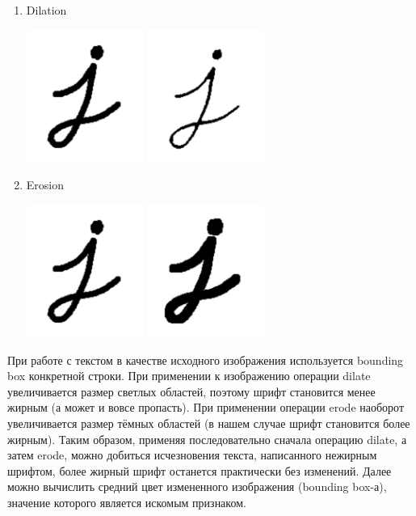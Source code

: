\documentclass[a4paper,12pt]{article}
\begin{document}
\begin{enumerate}

	\item Dilation

	\includegraphics[width=0.3\textwidth]{pics/normal.png} 
	\includegraphics[width=0.3\textwidth]{pics/dilate.png} 

	\item Erosion

	\includegraphics[width=0.3\textwidth]{pics/normal.png} 
	\includegraphics[width=0.3\textwidth]{pics/erode.png} 

\end{enumerate}

При работе с текстом в качестве исходного изображения используется bounding box конкретной строки. При применении к изображению операции dilate увеличивается размер светлых областей, поэтому шрифт становится менее жирным (а может и вовсе пропасть). При применении операции erode наоборот увеличивается размер тёмных областей (в нашем случае шрифт становится более жирным). Таким образом, применяя последовательно сначала операцию dilate, а затем erode, можно добиться исчезновения текста, написанного нежирным шрифтом, более жирный шрифт останется практически без изменений. Далее можно вычислить средний цвет измененного изображения (bounding box-а), значение которого является искомым признаком.  
\end{document}
